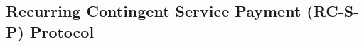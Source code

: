 

\subsection{Recurring Contingent Service Payment (RC-S-P) Protocol}\label{sec::RC-S-P-protocol}


 
